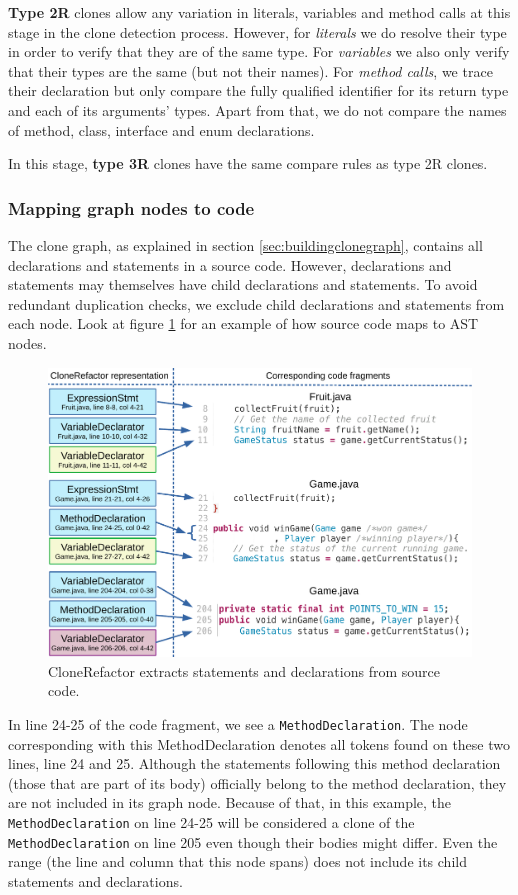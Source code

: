 \textbf{Type 2R} clones allow any variation in literals, variables and method calls at this stage in the clone detection process. However, for \textit{literals} we do resolve their type in order to verify that they are of the same type. For \textit{variables} we also only verify that their types are the same (but not their names). For \textit{method calls}, we trace their declaration but only compare the fully qualified identifier for its return type and each of its arguments' types. Apart from that, we do not compare the names of method, class, interface and enum declarations.

In this stage, \textbf{type 3R} clones have the same compare rules as type 2R clones.

\subsubsection{Mapping graph nodes to code}
The clone graph, as explained in section \ref{sec:buildingclonegraph}, contains all declarations and statements in a source code. However, declarations and statements may themselves have child declarations and statements. To avoid redundant duplication checks, we exclude child declarations and statements from each node. Look at figure \ref{fig:clonegraph} for an example of how source code maps to AST nodes.

\begin{figure}[H]
  \centering
  \includegraphics[width=1\columnwidth]{img/CloneGraphCode}
  \caption{CloneRefactor extracts statements and declarations from source code.}
  \label{fig:clonegraph}
\end{figure}

In line 24-25 of the code fragment, we see a \texttt{MethodDeclaration}. The node corresponding with this MethodDeclaration denotes all tokens found on these two lines, line 24 and 25. Although the statements following this method declaration (those that are part of its body) officially belong to the method declaration, they are not included in its graph node. Because of that, in this example, the \texttt{MethodDeclaration} on line 24-25 will be considered a clone of the \texttt{MethodDeclaration} on line 205 even though their bodies might differ. Even the range (the line and column that this node spans) does not include its child statements and declarations.

